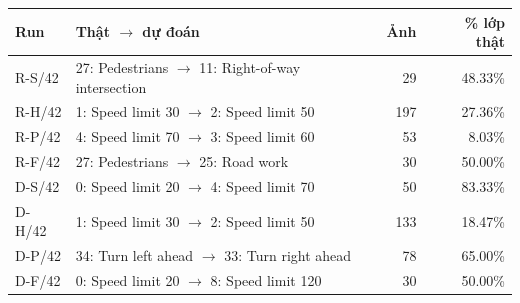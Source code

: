\begin{tabular}{l p{80mm} rr}
\toprule
Run & Thật $\to$ dự đoán & Ảnh & \% lớp thật\\
\midrule
R-S/42 & 27: Pedestrians $\to$ 11: Right-of-way intersection & 29 & 48.33\%\\
R-H/42 & 1: Speed limit 30 $\to$ 2: Speed limit 50 & 197 & 27.36\%\\
R-P/42 & 4: Speed limit 70 $\to$ 3: Speed limit 60 & 53 & 8.03\%\\
R-F/42 & 27: Pedestrians $\to$ 25: Road work & 30 & 50.00\%\\
D-S/42 & 0: Speed limit 20 $\to$ 4: Speed limit 70 & 50 & 83.33\%\\
D-H/42 & 1: Speed limit 30 $\to$ 2: Speed limit 50 & 133 & 18.47\%\\
D-P/42 & 34: Turn left ahead $\to$ 33: Turn right ahead & 78 & 65.00\%\\
D-F/42 & 0: Speed limit 20 $\to$ 8: Speed limit 120 & 30 & 50.00\%\\
\bottomrule
\end{tabular}
